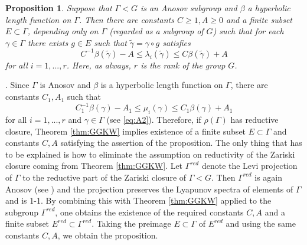 \documentclass[12pt]{amsbook}%
\newtheorem{prop}[thm]{Proposition}
\theoremstyle{definition}
\theoremstyle{remark}
\numberwithin{section}{chapter}
\numberwithin{subsection}{section}
\numberwithin{figure}{chapter}
\def\Ga{\Gamma}
\def\ga{\gamma}
\def\la{\lambda}
\def\kap{}
\begin{document}
{{\begin{prop}\label{Mishaseigenvaluelemma}%
Suppose that $\Gamma< G$ is an Anosov subgroup and $\beta$ a hyperbolic length function on $\Gamma$. 
Then there are constants  $C\geqslant 1, A\geqslant 0$ and a finite subset $E\subset \Gamma$, depending only on $\Gamma$ 
(regarded as a subgroup of $G$) such that for each $\gamma\in \Gamma$ there exists $g\in E$ such that $\tilde\ga=\ga\circ g$ satisfies 
$$
C^{-1} \beta(\tilde\gamma)- A \leqslant 
\la_i(\tilde\gamma)\leqslant C \beta(\tilde\gamma)+ A 
$$
for all $i=1,...,r$. Here, as always, $r$ is the rank of the group $G$. %
\end{prop}
. Since $\Ga$ is Anosov and $\beta$ is a hyperbolic length function on $\Ga$, there are constants $C_1, A_1$ such that
$$
C^{-1}_1 \beta(\gamma) - A_1 \leqslant \mu_i(\gamma)\leqslant C_1 \beta(\gamma) + A_1
$$
for all $i=1,...,r$ and $\gamma\in \Gamma$ (see \eqref{eq:A2}). Therefore, if $\rho(\Ga)$ has reductive closure, 
 Theorem \ref{thm:GGKW} implies existence of a finite subset $E\subset \Ga$ and constants $C, A$ satisfying the assertion of the proposition. 
The only thing that has to be explained is how to eliminate the assumption on reductivity of the Zariski closure coming from Theorem \ref{thm:GGKW}. Let $\Gamma^{red}$ denote the Levi projection of $\Gamma$ to the reductive part of the Zariski closure of $\Gamma< G$. Then  $\Gamma^{red}$ is again Anosov (see \cite{GGKW}) and the projection preserves the Lyapunov spectra of elements of $\Gamma$ and is 1-1. By combining this 
with Theorem \ref{thm:GGKW} applied to the subgroup $\Gamma^{red}$, 
one obtains the existence of the required constants $C, A$ and a 
finite subset $E^{red}\subset \Gamma^{red}$. 
Taking the preimage $E\subset \Ga$ of  $E^{red}$ 
and using the same constants $C, A$, 
we obtain the proposition. 


}}
\end{document}
